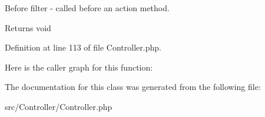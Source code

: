 Before filter -\/ called before an action method.

\begin{DoxyReturn}{Returns}
void 
\end{DoxyReturn}


Definition at line 113 of file Controller.\+php.

Here is the caller graph for this function\+:


The documentation for this class was generated from the following file\+:\begin{DoxyCompactItemize}
\item 
src/\+Controller/Controller.\+php\end{DoxyCompactItemize}
